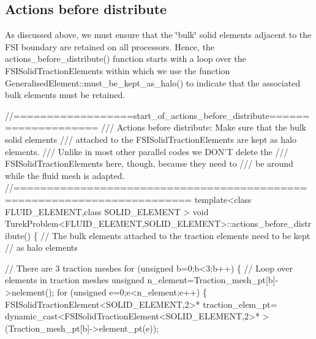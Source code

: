 \hypertarget{index_actions_before_distribute}{}\subsection{Actions before distribute}\label{index_actions_before_distribute}
As discussed above, we must ensure that the \char`\"{}bulk\char`\"{} solid elements adjacent to the F\+SI boundary are retained on all processors. Hence, the {\ttfamily actions\+\_\+before\+\_\+distribute()} function starts with a loop over the {\ttfamily F\+S\+I\+Solid\+Traction\+Elements} within which we use the function {\ttfamily Generalised\+Element\+::must\+\_\+be\+\_\+kept\+\_\+as\+\_\+halo()} to indicate that the associated bulk elements must be retained.

 
\begin{DoxyCodeInclude}
\textcolor{comment}{//==================start\_of\_actions\_before\_distribute====================}
\textcolor{comment}{/// Actions before distribute: Make sure that the bulk solid elements }
\textcolor{comment}{}\textcolor{comment}{/// attached to the FSISolidTractionElements are kept as halo elements.}
\textcolor{comment}{}\textcolor{comment}{/// Unlike in most other parallel codes we DON'T delete the }
\textcolor{comment}{}\textcolor{comment}{/// FSISolidTractionElements here, though, because they need to }
\textcolor{comment}{}\textcolor{comment}{/// be around while the fluid mesh is adapted.}
\textcolor{comment}{}\textcolor{comment}{//========================================================================}
\textcolor{keyword}{template}<\textcolor{keyword}{class} FLUID\_ELEMENT,\textcolor{keyword}{class} SOLID\_ELEMENT >
\textcolor{keywordtype}{void} TurekProblem<FLUID\_ELEMENT,SOLID\_ELEMENT>::actions\_before\_distribute()
\{
 \textcolor{comment}{// The bulk elements attached to the traction elements need to be kept}
 \textcolor{comment}{// as halo elements}

 \textcolor{comment}{// There are 3 traction meshes}
 \textcolor{keywordflow}{for} (\textcolor{keywordtype}{unsigned} b=0;b<3;b++)
  \{
   \textcolor{comment}{// Loop over elements in traction meshes}
   \textcolor{keywordtype}{unsigned} n\_element=Traction\_mesh\_pt[b]->nelement();
   \textcolor{keywordflow}{for} (\textcolor{keywordtype}{unsigned} e=0;e<n\_element;e++)
    \{
     FSISolidTractionElement<SOLID\_ELEMENT,2>* traction\_elem\_pt=
      \textcolor{keyword}{dynamic\_cast<}FSISolidTractionElement<SOLID\_ELEMENT,2>* \textcolor{keyword}{>}
      (Traction\_mesh\_pt[b]->element\_pt(e));


\end{DoxyCodeInclude}
